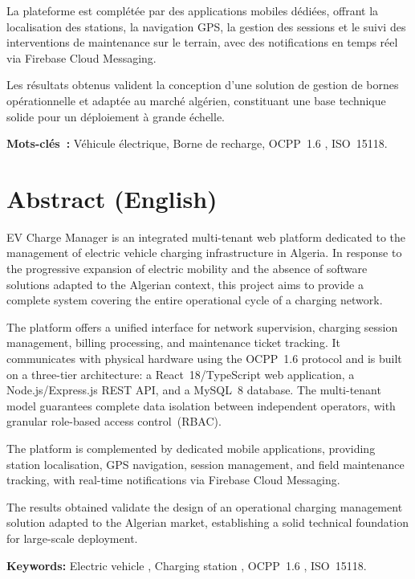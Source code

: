 \documentclass[12pt,a4paper]{report}
\begin{document}
La plateforme est complétée par des applications mobiles dédiées, offrant la localisation
des stations, la navigation GPS, la gestion des sessions et le suivi des interventions de
maintenance sur le terrain, avec des notifications en temps réel via Firebase Cloud Messaging.

Les résultats obtenus valident la conception d'une solution de gestion de bornes
opérationnelle et adaptée au marché algérien, constituant une base technique solide pour un
déploiement à grande échelle.

\medskip
\noindent\textbf{Mots-clés~:} Véhicule électrique, Borne de recharge, OCPP~1.6 , ISO~15118.

\clearpage
\section*{Abstract (English)}

EV Charge Manager is an integrated multi-tenant web platform dedicated to the management of
electric vehicle charging infrastructure in Algeria. In response to the progressive expansion
of electric mobility and the absence of software solutions adapted to the Algerian context,
this project aims to provide a complete system covering the entire operational cycle of a
charging network.

The platform offers a unified interface for network supervision, charging session management,
billing processing, and maintenance ticket tracking. It communicates with physical hardware
using the OCPP~1.6 protocol and is built on a three-tier architecture: a React~18/TypeScript
web application, a Node.js/Express.js REST API, and a MySQL~8 database. The multi-tenant
model guarantees complete data isolation between independent operators, with granular
role-based access control~(RBAC).

The platform is complemented by dedicated mobile applications, providing station localisation,
GPS navigation, session management, and field maintenance tracking, with real-time
notifications via Firebase Cloud Messaging.

The results obtained validate the design of an operational charging management solution
adapted to the Algerian market, establishing a solid technical foundation for large-scale
deployment.

\medskip
\noindent\textbf{Keywords:} Electric vehicle , Charging station , OCPP~1.6 , ISO~15118.
\end{document}

